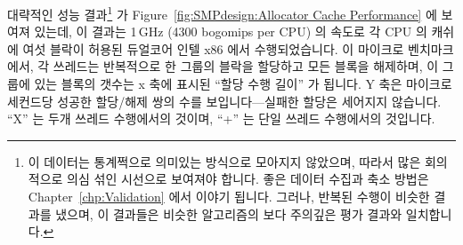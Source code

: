 대략적인 성능 결과\footnote{
	이 데이터는 통계쩍으로 의미있는 방식으로 모아지지 않았으며, 따라서 많은
	회의적으로 의심 섞인 시선으로 보여져야 합니다.
	좋은 데이터 수집과 축소 방법은 Chapter~\ref{chp:Validation} 에서 이야기
	됩니다.
	그러나, 반복된 수행이 비슷한 결과를 냈으며, 이 결과들은 비슷한
	알고리즘의 보다 주의깊은 평가 결과와 일치합니다.}
가 Figure~\ref{fig:SMPdesign:Allocator Cache Performance} 에 보여져 있는데, 이
결과는 1\,GHz (4300 bogomips per CPU) 의 속도로 각 CPU 의 캐쉬에 여섯 블락이
허용된 듀얼코어 인텔 x86 에서 수행되었습니다.
이 마이크로 벤치마크에서, 각 쓰레드는 반복적으로 한 그룹의 블락을 할당하고 모든
블록을 해제하며, 이 그룹에 있는 블록의 갯수는 x 축에 표시된 ``할당 수행 길이''
가 됩니다.
Y 축은 마이크로세컨드당 성공한 할당/해제 쌍의 수를 보입니다---실패한 할당은
세어지지 않습니다.
``X'' 는 두개 쓰레드 수행에서의 것이며, ``+'' 는 단일 쓰레드 수행에서의
것입니다.


